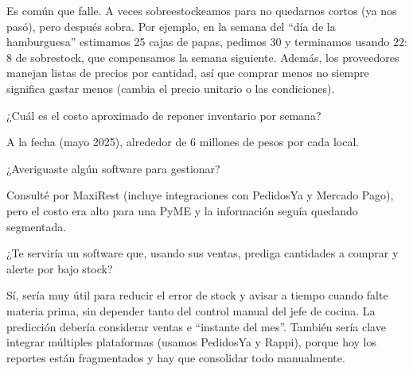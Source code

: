 \begin{description}[leftmargin=0cm, labelsep=0.5cm]
  \item[\textbf{Ulises Litterio:}] Es común que falle. A veces sobreestockeamos para no quedarnos cortos (ya nos pasó), pero después sobra. Por ejemplo, en la semana del “día de la hamburguesa” estimamos 25 cajas de papas, pedimos 30 y terminamos usando 22: 8 de sobrestock, que compensamos la semana siguiente. Además, los proveedores manejan listas de precios por cantidad, así que comprar menos no siempre significa gastar menos (cambia el precio unitario o las condiciones).

  \item[\textbf{Entrevistador:}] ¿Cuál es el costo aproximado de reponer inventario por semana?

  \item[\textbf{Ulises Litterio:}] A la fecha (mayo 2025), alrededor de 6 millones de pesos por cada local.

  \item[\textbf{Entrevistador:}] ¿Averiguaste algún software para gestionar?

  \item[\textbf{Ulises Litterio:}] Consulté por MaxiRest (incluye integraciones con PedidosYa y Mercado Pago), pero el costo era alto para una PyME y la información seguía quedando segmentada.

  \item[\textbf{Entrevistador:}] ¿Te serviría un software que, usando sus ventas, prediga cantidades a comprar y alerte por bajo stock?

  \item[\textbf{Ulises Litterio:}] Sí, sería muy útil para reducir el error de stock y avisar a tiempo cuando falte materia prima, sin depender tanto del control manual del jefe de cocina. La predicción debería considerar ventas e “instante del mes”. También sería clave integrar múltiples plataformas (usamos PedidosYa y Rappi), porque hoy los reportes están fragmentados y hay que consolidar todo manualmente.

\end{description}



